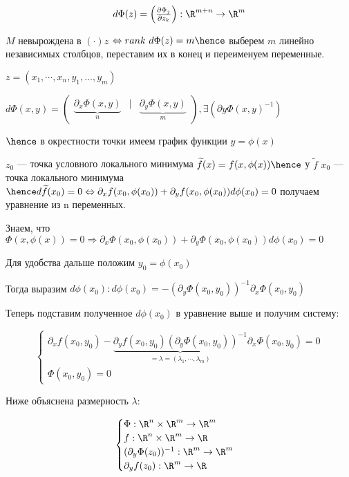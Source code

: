 \[
    d\Phi(z) = 
    \begin{pmatrix}
        \frac{\partial \Phi_j}{\partial z_k}
    \end{pmatrix} : \R ^ {m + n} \to \R ^ m
\]


$M $ невырождена в $(\cdot) z$ $\Leftrightarrow rank{\ d \Phi(z)} = m \hence$ выберем $m$ линейно независимых столбцов, переставим их в конец и переименуем переменные.

$z = (x_1, \cdots, x_n, y_1, ..., y_m)$

$d \Phi(x, y) = \begin{pmatrix}
    \underbrace{\partial_x \Phi(x, y)}_{n} &\bigg | & \underbrace{\partial_y \Phi(x, y)}_{m} 
\end{pmatrix}, \exists (\partial y \Phi(x, y)^ {-1})$

$\hence $ в окрестности точки имеем график функции $y = \phi(x)$

$z_0$ --- точка условного локального минимума $\widetilde{f}(x) = f(x, \phi(x)) \hence$ у  $\widetilde{f}$ $x_0$ --- точка локального минимума $\hence d \widetilde{f} (x_0) = 0 \Leftrightarrow \partial_x f(x_0, \phi(x_0)) + \partial_y f(x_0, \phi(x_0)) d \phi(x_0) = 0$ получаем уравнение из n переменных.


Знаем, что $\Phi(x, \phi(x)) = 0 \Rightarrow \partial_x \Phi(x_0, \phi(x_0)) + \partial_y \Phi(x_0, \phi(x_0)) d \phi(x_0) = 0$

Для удобства дальше положим $y_0 = \phi(x_0)$

Тогда выразим $d \phi(x_0): d \phi(x_0) = - (\partial_y \Phi(x_0, y_0)) ^ {-1} \partial_x \Phi(x_0, y_0)$

Теперь подставим полученное $d \phi(x_0)$ в уравнение выше и получим систему:

\[
\begin{cases}
    \partial_x f(x_0, y_0) - \underbrace{\partial_y f(x_0, y_0) (\partial_y \Phi(x_0, y_0))^{-1}}_{ = \lambda = (\lambda_1, \cdots, \lambda_m)} \partial_x \Phi(x_0, y_0) = 0\\

    \Phi(x_0, y_0) = 0
\end{cases}
\]

Ниже объяснена размерность $\lambda$:

\[
    \begin{cases}
    \Phi : \R ^ n \times \R ^ m \to \R ^ m\\
    f : \R ^ n \times \R ^ m \to \R\\
   (\partial_y \Phi(z_0))^{-1} : \R^ m \to \R ^m\\
   \partial_y f(z_0) : \R^m \to \R
    \end{cases}
\]


